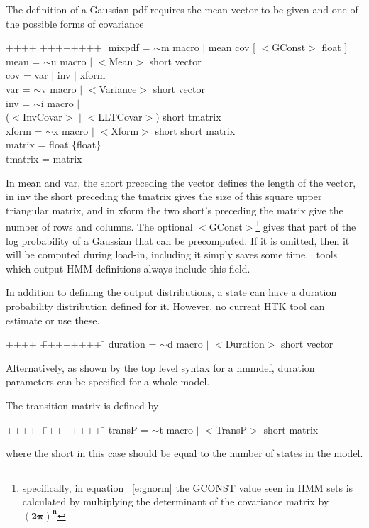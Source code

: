 The definition of a Gaussian pdf requires the mean vector to 
be given and one of the possible forms of covariance 
{\sf
\begin{tabbing}
++++ \= ++++++++ \=  \kill
\>   mixpdf = \> $\sim$m macro $|$ mean cov [ $<$GConst$>$ float ] \\
\>   mean = \> $\sim$u macro $|$ $<$Mean$>$ short vector \\
\>   cov =  \> var $|$ inv $|$ xform \\
\>   var = \> $\sim$v macro $|$ $<$Variance$>$ short vector \\
\>   inv = \> $\sim$i macro $|$ \\
\>        \> ($<$InvCovar$>$ $|$ $<$LLTCovar$>$) short tmatrix \\
\>   xform = \> $\sim$x macro $|$ $<$Xform$>$ short short matrix \\
\>   matrix = \> float \{float\} \\
\>   tmatrix = \> matrix \\
\end{tabbing}
}
\noindent
In {\sf mean} and {\sf var}, the {\sf short} preceding the {\sf vector}
defines the length of the vector, in {\sf inv} the {\sf short} preceding the {\sf
tmatrix} gives the size of this square upper triangular matrix, and in {\sf xform} the
two {\sf short}'s preceding the {\sf matrix} give the number of rows and
columns. 
The optional {\sf $<$GConst$>$}\footnote{specifically, in equation 
~\ref{e:gnorm} 
the GCONST value seen in HMM sets is calculated by multiplying the determinant 
of the covariance matrix by $\bm{(2 \pi)^n}$}  gives 
that part of the log
probability of a Gaussian that can be precomputed.  If it is omitted, then
it will be computed during load-in, including it simply saves some time.
\HTK\ tools which output HMM definitions always include this field.

In addition to defining the output distributions, a state can have a
duration probability distribution defined for it. However, no current HTK
tool can estimate or use these.
{\sf
\begin{tabbing}
++++ \= ++++++++ \=  \kill
\>   duration = \> $\sim$d macro $|$ $<$Duration$>$ short vector
\end{tabbing}
}
\noindent
Alternatively, as shown by the top level syntax for a {\sf hmmdef},
duration parameters can be specified for a whole model.

The transition matrix is defined by
{\sf
\begin{tabbing}
++++ \= ++++++++ \=  \kill
\>   transP = \> $\sim$t macro $|$ $<$TransP$>$ short matrix
\end{tabbing}
}
\noindent
where the {\sf short} in this case should be equal to the number of
states in the model. 

